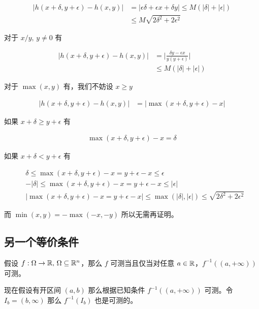 \begin{align*}
\lvert h(x+\delta, y+\epsilon) - h(x,y) \rvert &= \lvert \epsilon\delta + \epsilon x  + \delta y\rvert \le M(\lvert \delta \rvert + \lvert \epsilon \rvert) \\
& \le M\sqrt{2\delta^2 + 2\epsilon^2}
\end{align*}


对于 $x/y,\, y \ne 0$ 有

\begin{align*}
\lvert h(x+\delta, y+\epsilon) - h(x,y) \rvert &= \lvert \frac{\delta y - \epsilon x }{y(y+\epsilon)}\rvert  \\
& \le M(\lvert \delta \rvert + \lvert \epsilon \rvert)
\end{align*}

对于 $\max(x,y)$ 有，我们不妨设 $x \ge y$

\begin{align*}
\lvert h(x+\delta, y+\epsilon) - h(x,y) \rvert &= \lvert \max(x+\delta, y+\epsilon) - x\rvert 
\end{align*}

如果 $x+\delta \ge y + \epsilon$ 有


\begin{align*}
\max(x+\delta, y+\epsilon) - x = \delta
\end{align*}

如果 $x+\delta < y + \epsilon$ 有

\begin{align*}
&\delta \le \max(x+\delta, y+\epsilon) - x = y + \epsilon - x \le \epsilon \\
& - \lvert \delta \rvert \le \max(x+\delta, y+\epsilon) - x = y + \epsilon - x \le \lvert \epsilon \rvert \\
& \lvert\max(x+\delta, y+\epsilon) - x = y + \epsilon - x \rvert \le \max(\lvert \delta \rvert, \lvert \epsilon \rvert) \le \sqrt{2\delta^2 + 2\epsilon^2}
\end{align*}


而 $\min(x,y) = - \max(-x, -y)$ 所以无需再证明。

\subsection{另一个等价条件}

假设 $f: \Omega \to \mathbb{R},\, \Omega \subseteq \mathbb{R}^n$，那么 $f$ 可测当且仅当对任意 $a \in \mathbb{R}$，$f^{-1}((a, +\infty))$ 可测。

现在假设有开区间 $(a,b)$ 那么根据已知条件 $f^{-1}((a,+\infty))$ 可测。令 $I_b = (b, \infty)$ 那么 $f^{-1}(I_b)$ 也是可测的。

